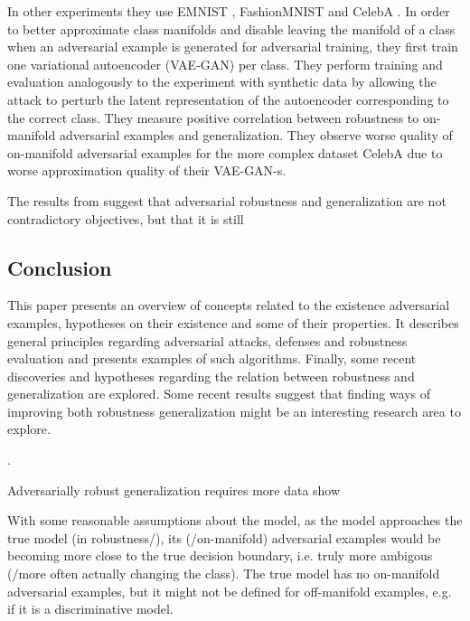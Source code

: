 \documentclass[twocolumn]{article}
\begin{document}
In other experiments they use EMNIST \citep{Cohen:2017:EMNIST}, FashionMNIST \citep{Xiao:2017:FMNIDBMLA} and CelebA \citep{Liu:2015:DLFAW}. In order to better approximate class manifolds and disable leaving the manifold of a class when an adversarial example is generated for adversarial training, they first train one variational autoencoder (VAE-GAN) per class. They perform training and evaluation analogously to the experiment with synthetic data by allowing the attack to perturb the latent representation of the autoencoder corresponding to the correct class. They measure positive correlation between robustness to on-manifold adversarial examples and generalization. They observe worse quality of on-manifold adversarial examples for the more complex dataset CelebA due to worse approximation quality of their VAE-GAN-s.

The results from \cite{Stutz:2018:DARG} suggest that adversarial robustness and generalization are not contradictory objectives, but that it is still 


\subsection{Conclusion}

This paper presents an overview of concepts related to the existence adversarial examples, hypotheses on their existence and some of their properties. It describes general principles regarding adversarial attacks, defenses and robustness evaluation and presents examples of such algorithms. Finally, some recent discoveries and hypotheses regarding the relation between robustness and generalization are explored. Some recent results  \citep{Stutz:2018:DARG} suggest that finding ways of improving both robustness generalization might be an interesting research area to explore.


\newpage.
\newpage

 Adversarially robust generalization requires
more data show 

With some reasonable assumptions about the model, as the model approaches the true model (in robustness/), its (/on-manifold) adversarial examples would be becoming more close to the true decision boundary, i.e. truly more ambigous (/more often actually changing the class). The true model has no on-manifold adversarial examples, but it might not be defined for off-manifold examples, e.g. if it is a discriminative model.
\end{document}
